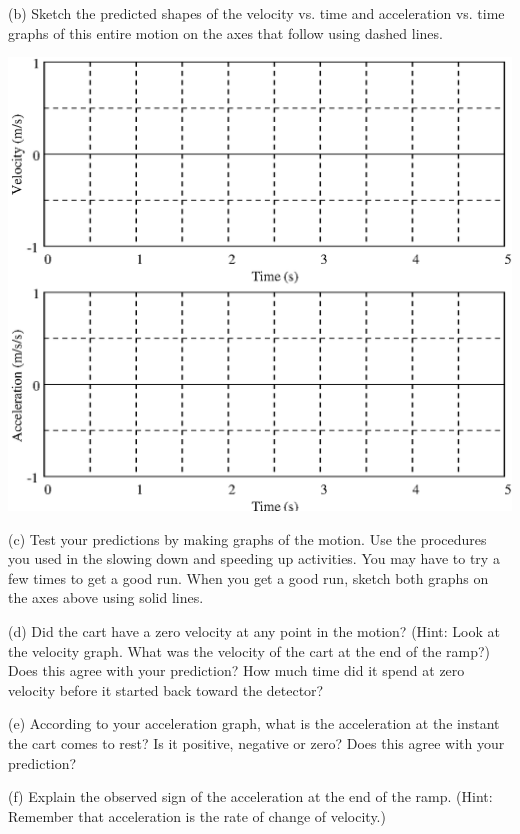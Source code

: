 (b) Sketch the predicted shapes of the velocity vs. time and acceleration vs.
time graphs of this entire motion on the axes that follow using dashed lines.

\vspace{0.3cm}
{\par\centering \includegraphics{slowing/slowing_fig5.eps} \par}
\vspace{13mm}

(c) Test your predictions by making graphs of the motion. Use the procedures
you used in the slowing down and speeding up activities. You may have to try
a few times to get a good run. When you get a good run, sketch both graphs on the axes above using solid lines.

(d) Did the cart have a zero velocity at any point in the motion? (Hint: Look
at the velocity graph. What was the velocity of the cart at the end of the ramp?)
Does this agree with your prediction? How much time did it spend at zero velocity
before it started back toward the detector?
\vspace{20mm}

(e) According to your acceleration graph, what is the acceleration at the instant
the cart comes to rest? Is it positive, negative or zero? Does this agree with
your prediction? 
\vspace{20mm}

(f) Explain the observed sign of the acceleration at the end of the ramp. (Hint: Remember that acceleration is the rate of change of velocity.) 
\vspace{20mm}

